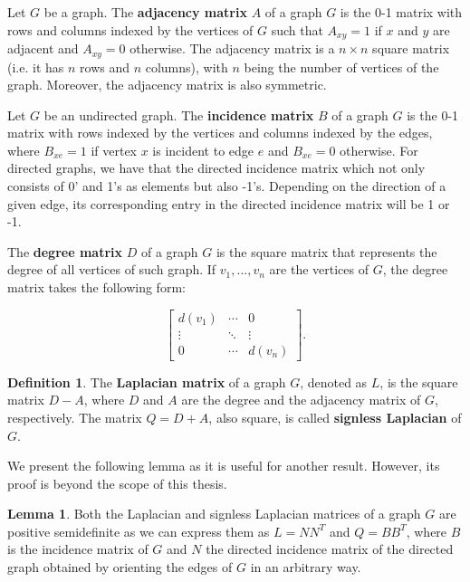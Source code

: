 \documentclass[11pt]{article}
\theoremstyle{definition}
\newtheorem{defn}{Definition}
\newtheorem{lemma}{Lemma}
\begin{document}
Let $G$ be a graph. The \textbf{adjacency matrix} $A$ of a graph $G$ is the 0-1 matrix with rows and columns indexed by the vertices of $G$ such that $A_{xy} = 1$ if $x$ and $y$ are adjacent and $A_{xy} = 0$ otherwise. The adjacency matrix is a $n \times n$ square matrix (i.e. it has $n$ rows and $n$ columns), with $n$ being the number of vertices of the graph. Moreover, the adjacency matrix is also symmetric.  

Let $G$ be an undirected graph. The \textbf{incidence matrix} $B$ of a graph $G$ is the 0-1 matrix with rows indexed by the vertices and columns indexed by the edges, where $B_{xe} = 1$ if vertex $x$ is incident to edge $e$ and $B_{xe} = 0$ otherwise. For directed graphs, we have that the directed incidence matrix which not only consists of 0' and 1's as elements but also -1's. Depending on the direction of a given edge, its corresponding entry in the directed incidence matrix will be 1 or -1.  

The \textbf{degree matrix} $D$ of a graph $G$ is the square matrix that represents the degree of all vertices of such graph. If $v_1, ..., v_n$ are the vertices of $G$, the degree matrix takes the following form:

\begin{equation*}
    \begin{bmatrix}
        d(v_1) & \cdots & 0 \\
        \vdots & \ddots & \vdots \\
        0 & \cdots & d(v_n) 
    \end{bmatrix}.
\end{equation*}

\bigskip

\begin{defn}
The \textbf{Laplacian matrix} of a graph $G$, denoted as $L$, is the square matrix $D - A$, where $D$ and $A$ are the degree and the adjacency matrix of $G$, respectively. The matrix $Q = D + A$, also square, is called \textbf{signless Laplacian} of $G$.
\end{defn}

We present the following lemma as it is useful for another result. However, its proof is beyond the scope of this thesis.

\begin{lemma}
Both the Laplacian and signless Laplacian matrices of a graph $G$ are positive semidefinite as we can express them as $L = NN^T$ and $Q = BB^T$, where $B$ is the incidence matrix of $G$ and $N$ the directed incidence matrix of the directed graph obtained by orienting the edges of $G$ in an arbitrary way.
\end{lemma}
\end{document}
